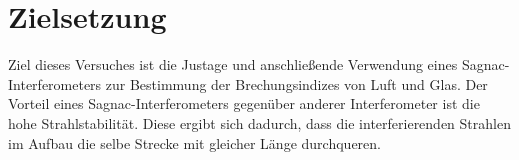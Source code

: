 \section{Zielsetzung}
\label{sec:Zielsetzung}

Ziel dieses Versuches ist die Justage und anschließende Verwendung eines Sagnac-Interferometers zur Bestimmung der Brechungsindizes von Luft und Glas.
Der Vorteil eines Sagnac-Interferometers gegenüber anderer Interferometer ist die hohe Strahlstabilität. Diese ergibt sich dadurch, dass die interferierenden Strahlen
im Aufbau die selbe Strecke mit gleicher Länge durchqueren.